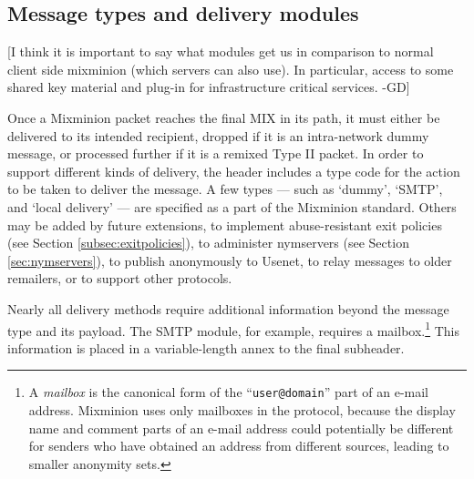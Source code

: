 \documentclass[11pt]{IEEEtran}
\begin{document}
\subsection{Message types and delivery modules}
\label{subsec:delivery-modules}

[I think it is important to say what modules get us in comparison to
normal client side mixminion (which servers can also use). In
particular, access to some shared key material and plug-in for
infrastructure critical services. -GD]

Once a Mixminion packet reaches the final MIX in its path, it must
either be delivered to its intended recipient, dropped if it is an
intra-network dummy message, or processed further if it is a remixed
Type II packet. In order to support different kinds of
delivery, the header includes a type code for the action to be taken
to deliver the message.  A few types --- such as `dummy', `SMTP', and
`local delivery' --- are specified as a part of the Mixminion
standard.  Others may be added by future extensions, to
implement abuse-resistant exit policies (see Section
\ref{subsec:exitpolicies}), to administer nymservers (see Section
\ref{sec:nymservers}), to publish anonymously to Usenet, to relay
messages to older remailers, or to support other protocols.

Nearly all delivery methods require additional information beyond the
message type and its payload.  The SMTP module, for example, requires
a mailbox.\footnote{A {\it mailbox} is the canonical form of the
``{\tt user@domain}'' part of an e-mail address. Mixminion uses only
mailboxes in the protocol, because the display name and comment parts
of an e-mail address could potentially be different for senders who
have obtained an address from different sources, leading to smaller
anonymity sets.}
This information is placed
in a variable-length annex to the final subheader.
\end{document}
